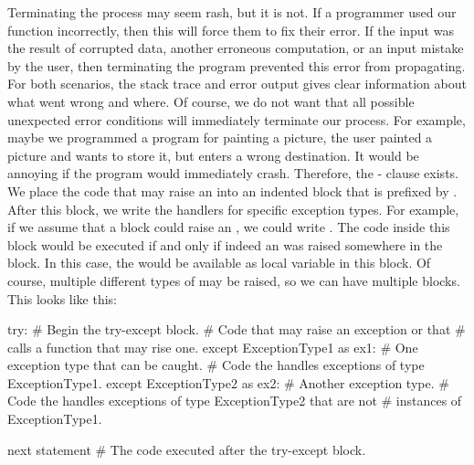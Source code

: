 Terminating the process may seem rash, but it is not.
If a programmer used our  function incorrectly, then this will force them to fix their error.
If the input  was the result of corrupted data, another erroneous computation, or an input mistake by the user, then terminating the program prevented this error from propagating.
For both scenarios, the stack trace and error output gives clear information about what went wrong and where.%
%
\endhsection%
%
%
%
Of course, we do not want that all possible unexpected error conditions will immediately terminate our process.
For example, maybe we programmed a program for painting a picture, the user painted a picture and wants to store it, but enters a wrong destination.
It would be annoying if the program would immediately crash.%
%
%
%
Therefore, the \nobreakdashes- clause exists.
We place the code that may raise an  into an indented block that is prefixed by .
After this block, we write the handlers for specific exception types.
For example, if we assume that a block could raise an , we could write .
The code inside this  block would be executed if and only if indeed an  was raised somewhere in the  block.
In this case, the  would be available as local variable  in this block.
Of course, multiple different types of  may be raised, so we can have multiple  blocks.
This looks like this:%
%
\begin{pythonSyntax}
try:  # Begin the try-except block.
    # Code that may raise an exception or that
    # calls a function that may rise one.
except ExceptionType1 as ex1:  # One exception type that can be caught.
    # Code the handles exceptions of type ExceptionType1.
except ExceptionType2 as ex2:  # Another exception type.
    # Code the handles exceptions of type ExceptionType2 that are not
    # instances of ExceptionType1.

next statement  # The code executed after the try-except block.
\end{pythonSyntax}
%
%
